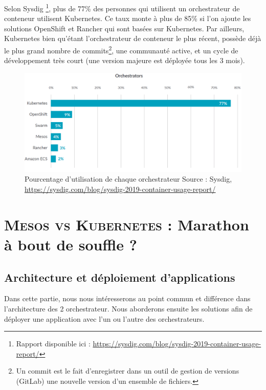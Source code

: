 \documentclass[11pt,fleqn]{book} %
\begin{document}
Selon Sysdig \footnote{ Rapport disponible ici : \url{https://sysdig.com/blog/sysdig-2019-container-usage-report/}}, plus de 77\% des personnes qui utilisent un orchestrateur de conteneur utilisent Kubernetes. Ce taux monte à plus de 85\% si l'on ajoute les solutions OpenShift et Rancher qui sont basées sur Kubernetes. Par ailleurs, Kubernetes bien qu'étant l'orchestrateur de conteneur le plus récent, possède déjà le plus grand nombre de commits\footnote{Un commit est le fait d'enregistrer dans un outil de gestion de versions (GitLab) une nouvelle version d'un ensemble de fichiers.}, une communauté active, et un cycle de développement très court (une version majeure est déployée tous les 3 mois).

\begin{figure}[H]\centering
\renewcommand{\figurename}{Graphique}
\includegraphics[scale=0.3]{Pictures/orchestrators-2019.png}
\captionsetup{margin=1.5cm,format=hang,justification=justified}
\caption[]{Pourcentage d'utilisation de chaque orchestrateur\newline
Source : Sysdig, \url{https://sysdig.com/blog/sysdig-2019-container-usage-report/}}
\end{figure}


\part{\textcolor{ocre}{\textsc{Mesos vs Kubernetes} : Marathon à bout de souffle ?}}



\chapter{Architecture et déploiement d'applications}
\vspace{-2cm}
Dans cette partie, nous nous intéresserons au point commun et différence dans l'architecture des 2 orchestrateur. Nous aborderons ensuite les solutions afin de déployer une application avec l'un ou l'autre des orchestrateurs.
\end{document}
